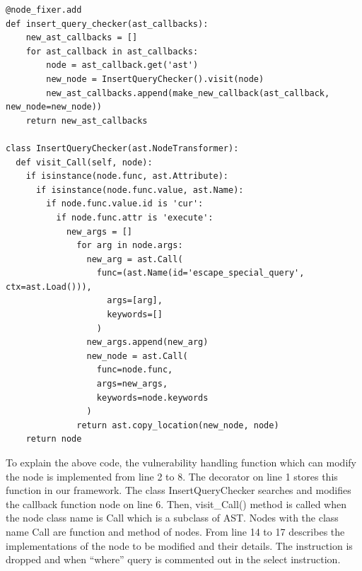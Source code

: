 \documentclass[conference]{IEEEtran}
\begin{document}
\begin{lstlisting}[caption={A vulnerable handling function which address a SQL injection.}, label=code:decorator, captionpos=b]
@node_fixer.add
def insert_query_checker(ast_callbacks):
    new_ast_callbacks = []
    for ast_callback in ast_callbacks:
        node = ast_callback.get('ast')
        new_node = InsertQueryChecker().visit(node)
        new_ast_callbacks.append(make_new_callback(ast_callback, new_node=new_node))
    return new_ast_callbacks

class InsertQueryChecker(ast.NodeTransformer):
  def visit_Call(self, node):
    if isinstance(node.func, ast.Attribute):
      if isinstance(node.func.value, ast.Name):
        if node.func.value.id is 'cur':
          if node.func.attr is 'execute':
            new_args = []
              for arg in node.args:
                new_arg = ast.Call(
                  func=(ast.Name(id='escape_special_query', ctx=ast.Load())),
                    args=[arg],
                    keywords=[]
                  )
                new_args.append(new_arg)
                new_node = ast.Call(
                  func=node.func,
                  args=new_args,
                  keywords=node.keywords
                )
              return ast.copy_location(new_node, node)
    return node
\end{lstlisting}
To explain the above code, the vulnerability handling function which can modify the node is implemented from line 2 to 8.
The decorator on line 1 stores this function in our framework.
The class InsertQueryChecker searches and modifies the callback function node on line 6.
Then, visit\_Call() method is called when the node class name is Call which is a subclass of AST.
Nodes with the class name Call are function and method of nodes.
From line 14 to 17 describes the implementations of the node to be modified and their details.
The instruction is dropped and when “where” query is commented out in the select instruction.
\end{document}
